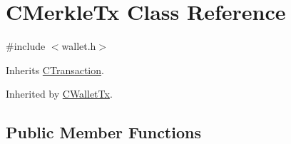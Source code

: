 \hypertarget{class_c_merkle_tx}{}\section{C\+Merkle\+Tx Class Reference}
\label{class_c_merkle_tx}


{\ttfamily \#include $<$wallet.\+h$>$}



Inherits \mbox{\hyperlink{class_c_transaction}{C\+Transaction}}.



Inherited by \mbox{\hyperlink{class_c_wallet_tx}{C\+Wallet\+Tx}}.

\subsection*{Public Member Functions}
